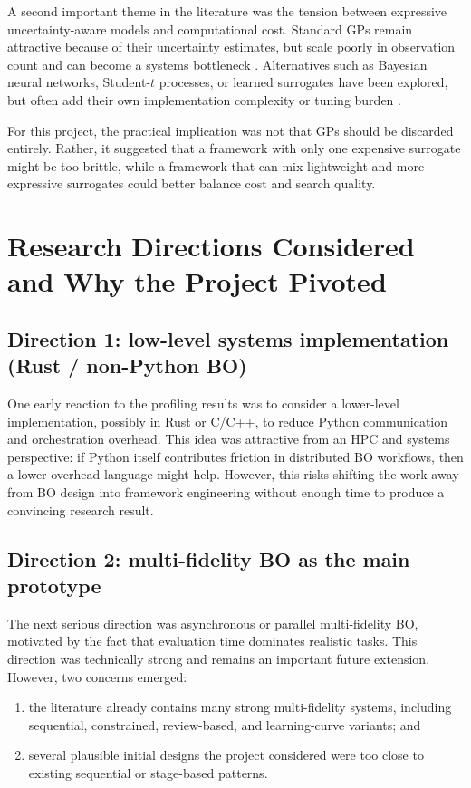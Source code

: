 \documentclass[11pt]{article}
\begin{document}
A second important theme in the literature was the tension between expressive uncertainty-aware models and computational cost. Standard GPs remain attractive because of their uncertainty estimates, but scale poorly in observation count and can become a systems bottleneck \cite{shahriari2016review, wilson2015kissgp}. Alternatives such as Bayesian neural networks, Student-$t$ processes, or learned surrogates have been explored, but often add their own implementation complexity or tuning burden \cite{oumer2026baseline}.

For this project, the practical implication was not that GPs should be discarded entirely. Rather, it suggested that a framework with only one expensive surrogate might be too brittle, while a framework that can mix lightweight and more expressive surrogates could better balance cost and search quality.

\section{Research Directions Considered and Why the Project Pivoted}

\subsection{Direction 1: low-level systems implementation (Rust / non-Python BO)}

One early reaction to the profiling results was to consider a lower-level implementation, possibly in Rust or C/C++, to reduce Python communication and orchestration overhead. This idea was attractive from an HPC and systems perspective: if Python itself contributes friction in distributed BO workflows, then a lower-overhead language might help. However, this risks shifting the work away from BO design into framework engineering without enough time to produce a convincing research result.

\subsection{Direction 2: multi-fidelity BO as the main prototype}

The next serious direction was asynchronous or parallel multi-fidelity BO, motivated by the fact that evaluation time dominates realistic tasks. This direction was technically strong and remains an important future extension. However, two concerns emerged:
\begin{enumerate}[leftmargin=1.5em]
    \item the literature already contains many strong multi-fidelity systems, including sequential, constrained, review-based, and learning-curve variants; and
    \item several plausible initial designs the project considered were too close to existing sequential or stage-based patterns.
\end{enumerate}
\end{document}
